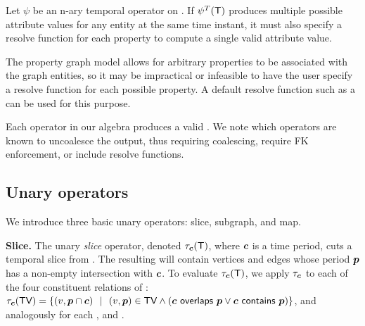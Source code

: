\begin{lemma}
Let $\psi$ be an n-ary temporal operator on \tg.  If $\psi^T (\mathsf{T})$
produces multiple possible attribute values for any entity at the same
time instant, it must also specify a resolve function for each
property to compute a single valid attribute value.
\end{lemma}

The property graph model allows for arbitrary properties to be
associated with the graph entities, so it may be impractical or
infeasible to have the user specify a resolve function for each
possible property.  A default resolve function such as a 
can be used for this purpose.


Each operator in our algebra produces a valid \tg.  We note which
operators are known to uncoalesce the output, thus requiring
coalescing, require FK enforcement, or include resolve functions.

\subsection{Unary operators}
\label{sec:algebra:unary}

We introduce three basic unary operators: slice, subgraph, and map.

{\bf Slice.}  The unary {\em slice} operator, denoted $\tau_{\boldsymbol{c}} (\mathsf{T})$,
where $\boldsymbol{c}$ is a time period, cuts a temporal slice from \ttt.  The
resulting \tg will contain vertices and edges whose period $\boldsymbol{p}$ has a
non-empty intersection with $\boldsymbol{c}$.  To evaluate $\tau_{\boldsymbol{c}} (\mathsf{T})$, we
apply $\tau_{\boldsymbol{c}}$ to each of the four constituent relations of \tve:
$\tau_{\boldsymbol{c}} (\textsf{TV}) = \{ (v, \boldsymbol{p} \cap \boldsymbol{c})~~|~~(v, \boldsymbol{p}) \in \textsf{TV} \wedge
(\boldsymbol{c}~\mathsf{overlaps}~\boldsymbol{p} \vee \boldsymbol{c}~\mathsf{contains}~\boldsymbol{p}) \}$, and
analogously for each \te, \tav and \tae.


